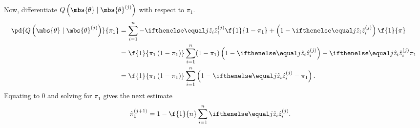 Now, differentiate $Q\left(\mbs{\theta}\mid\mbs{\theta}^{(j)}\right)$ with respect to $\pi_{1}$.
\begin{align}
    \pd{
        Q\left( \mbs{\theta}\mid\mbs{\theta}^{(j)} \right)
    }{
        \pi_{1}
    }
    &=
    \sum_{i=1}^{n}-\zhat[j]{i}\f{1}{1-\pi_{1}} + \left(1-\zhat[j]{i}\right)\f{1}{ \pi}\\
    &=
    \f{1}{\pi_{1}\left( 1-\pi_{1} \right)}\sum_{i=1}^{n} (1-\pi_{1})\left(1-\zhat[j]{i}\right) -\zhat[j]{i}\pi_{1}\\
    &=
    \f{1}{\pi_{1}\left( 1-\pi_{1} \right)}\sum_{i=1}^{n}\left(1 -\zhat[j]{i} - \pi_{1}\right).
\end{align}
Equating to $0$ and solving for $\pi_{1}$ gives the next estimate
\begin{align}
    \hat{\pi}_{1}^{(j+1)} &= 1 - \f{1}{n}\sum_{i=1}^{n}\zhat[j]{i}.
\end{align}